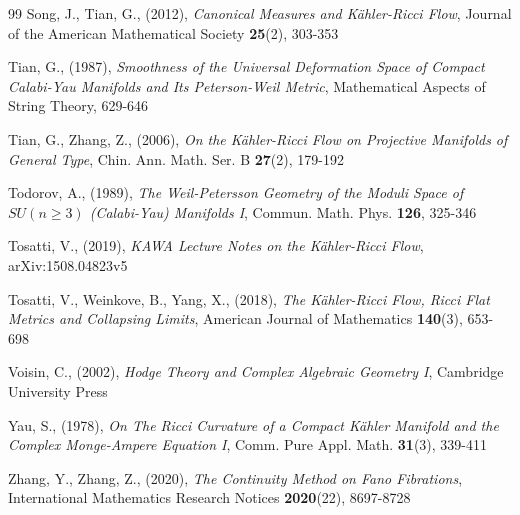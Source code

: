 \documentclass[12pt]{article}
\numberwithin{equation}{section}
\begin{document}
\begin{thebibliography}{99}
 Song, J., Tian, G., (2012), 
\textit{Canonical Measures and K\"ahler-Ricci Flow}, 
Journal of the American Mathematical Society \textbf{25}(2), 303-353

 Tian, G., (1987), 
\textit{Smoothness of the Universal Deformation Space of Compact Calabi-Yau Manifolds and Its Peterson-Weil Metric}, 
Mathematical Aspects of String Theory, 629-646

 Tian, G., Zhang, Z., (2006),
\textit{On the K\"ahler-Ricci Flow on Projective Manifolds of General Type}, 
Chin. Ann. Math. Ser. B \textbf{27}(2), 179-192

 Todorov, A., (1989), 
\textit{The Weil-Petersson Geometry of the Moduli Space of $SU(n\geq 3)$ (Calabi-Yau) Manifolds I}, 
Commun. Math. Phys. \textbf{126}, 325-346 

 Tosatti, V., (2019), 
\textit{KAWA Lecture Notes on the K\"ahler-Ricci Flow}, 
arXiv:1508.04823v5

 Tosatti, V., Weinkove, B., Yang, X., (2018), 
\textit{The K\"ahler-Ricci Flow, Ricci Flat Metrics and Collapsing Limits}, 
American Journal of Mathematics \textbf{140}(3), 653-698

 Voisin, C., (2002), 
\textit{Hodge Theory and Complex Algebraic Geometry I},
Cambridge University Press

 Yau, S., (1978), 
\textit{On The Ricci Curvature of a Compact K\"ahler Manifold and the Complex Monge-Ampere Equation I}, 
Comm. Pure Appl. Math. \textbf{31}(3), 339-411

 Zhang, Y., Zhang, Z., (2020), 
\textit{The Continuity Method on Fano Fibrations}, 
International Mathematics Research Notices \textbf{2020}(22), 8697-8728

\end{thebibliography}
\end{document}
